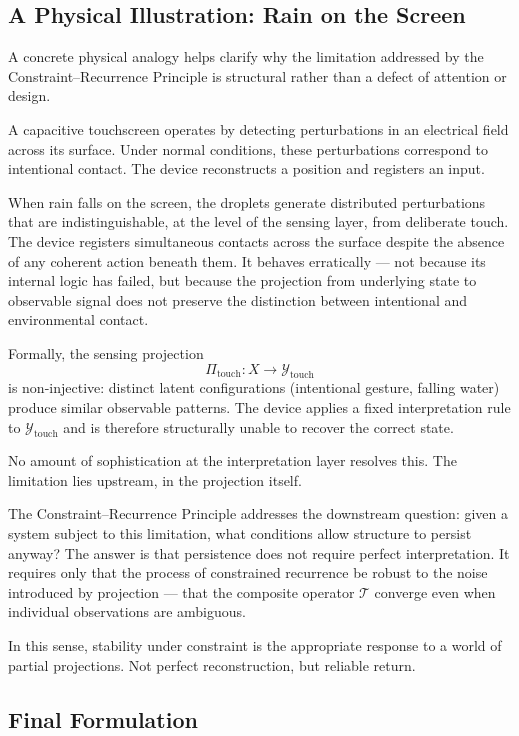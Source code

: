 \documentclass[12pt, oneside]{article}
\theoremstyle{definition}
\theoremstyle{remark}
\begin{document}
\subsection{A Physical Illustration: Rain on the Screen}

A concrete physical analogy helps clarify why the limitation addressed by the Constraint--Recurrence Principle is structural rather than a defect of attention or design.

A capacitive touchscreen operates by detecting perturbations in an electrical field across its surface.
Under normal conditions, these perturbations correspond to intentional contact.
The device reconstructs a position and registers an input.

When rain falls on the screen, the droplets generate distributed perturbations that are indistinguishable, at the level of the sensing layer, from deliberate touch.
The device registers simultaneous contacts across the surface despite the absence of any coherent action beneath them.
It behaves erratically --- not because its internal logic has failed, but because the projection from underlying state to observable signal does not preserve the distinction between intentional and environmental contact.

Formally, the sensing projection
\[
\Pi_{\mathrm{touch}} : X \to \mathcal{Y}_{\mathrm{touch}}
\]
is non-injective: distinct latent configurations (intentional gesture, falling water) produce similar observable patterns.
The device applies a fixed interpretation rule to $\mathcal{Y}_{\mathrm{touch}}$ and is therefore structurally unable to recover the correct state.

No amount of sophistication at the interpretation layer resolves this.
The limitation lies upstream, in the projection itself.

The Constraint--Recurrence Principle addresses the downstream question: given a system subject to this limitation, what conditions allow structure to persist anyway?
The answer is that persistence does not require perfect interpretation.
It requires only that the process of constrained recurrence be robust to the noise introduced by projection --- that the composite operator $\mathcal{T}$ converge even when individual observations are ambiguous.

In this sense, stability under constraint is the appropriate response to a world of partial projections.
Not perfect reconstruction, but reliable return.

\subsection{Final Formulation}
\end{document}
